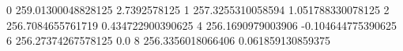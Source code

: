 0 259.01300048828125 2.7392578125
1 257.3255310058594 1.051788330078125
2 256.7084655761719 0.434722900390625
4 256.1690979003906 -0.104644775390625
6 256.27374267578125 0.0
8 256.3356018066406 0.061859130859375
